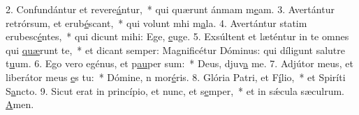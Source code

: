2. Confundántur et revere\uline{á}ntur,~* qui quærunt ánmam m\uline{e}am.
3. Avertántur retrórsum, et erub\uline{é}scant,~* qui volunt mhi m\uline{a}la.
4. Avertántur statim erubesc\uline{é}ntes,~* qui dicunt mihi: Ege, \uline{e}uge.
5. Exsúltent et læténtur in te omnes qui \uline{quæ}runt te,~* et dicant semper: Magnificétur Dóminus: qui díligunt salutre t\uline{u}um.
6. Ego vero egénus, et p\uline{au}per sum:~* Deus, djuv\uline{a} me.
7. Adjútor meus, et liberátor meus \uline{e}s tu:~* Dómine, n mor\uline{é}ris.
8. Glória Patri, et F\uline{í}lio,~* et Spiríti S\uline{a}ncto.
9. Sicut erat in princípio, et nunc, et s\uline{e}mper,~* et in sǽcula sæculrum. \uline{A}men.
